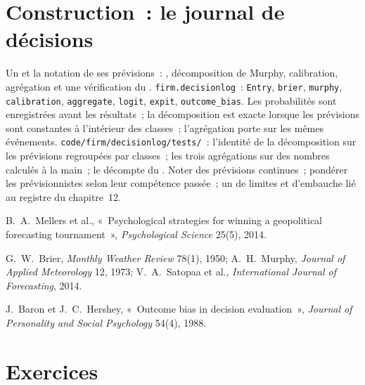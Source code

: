 \section{Construction~: le journal de décisions}\label{bld:fm:culture-and-decision-making:decisionlog}

\begin{build}
 Un  et la notation de ses prévisions~: , décomposition de Murphy, calibration, agrégation et une
vérification du .
 \texttt{firm.decisionlog}~: \texttt{Entry}, \texttt{brier}, \texttt{murphy}, \texttt{calibration}, \texttt{aggregate},
\texttt{logit}, \texttt{expit}, \texttt{outcome\_bias}.
 Les probabilités sont enregistrées avant les résultats~; la décomposition est exacte lorsque les prévisions sont constantes à l'intérieur des classes~; l'agrégation porte sur
les mêmes événements.
 \texttt{code/firm/decisionlog/tests/}~: l'identité de la décomposition sur les prévisions regroupées par classes~; les trois agrégations sur des
nombres calculés à la main~; le décompte du .
 Noter des prévisions continues~; pondérer les prévisionnistes selon leur compétence passée~; un  de limites et d'embauche lié au
registre du chapitre~12.
\end{build}

\begin{omsources}
\item B.~A.~Mellers et al., «~Psychological strategies for winning a geopolitical forecasting tournament~», \emph{Psychological Science} 25(5), 2014.
\item G.~W.~Brier, \emph{Monthly Weather Review} 78(1), 1950; A.~H.~Murphy, \emph{Journal of Applied Meteorology} 12, 1973; V.~A.~Satopaa et al.,
\emph{International Journal of Forecasting}, 2014.
\item J.~Baron et J.~C.~Hershey, «~Outcome bias in decision evaluation~», \emph{Journal of Personality and Social Psychology} 54(4), 1988.
\end{omsources}

\section{Exercices}

